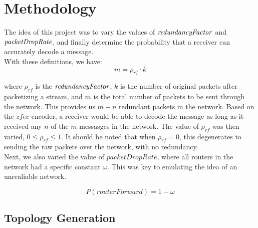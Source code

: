 \section{Methodology}
\label{sec: Methodology}

The idea of this project was to vary the values of $\it{redundancyFactor}$ and $\it{packetDropRate}$, and finally determine the probability that a receiver can accurately decode a message. \\
With these definitions, we have: 
\begin{equation} \label{eq: yPlus}
    m = \rho_{rf} \cdot k
\end{equation}

where $\rho_{rf}$ is the $\it{redundancyFactor}$, $k$ is the number of original packets after packetizing a stream, and $m$ is the total number of packets to be sent through the network. This provides us 
$m-n$ redundant packets in the network. Based on the $zfec$ encoder, a receiver would be able to decode the message as long as it received any $n$ of the $m$ messasges in the network. The value of $\rho_{rf}$ was then varied, $0\leq\rho_{rf}\leq1$. It should be noted that when $\rho_{rf} = 0$, this degenerates to sending the raw packets over the network, with no redundancy. \\
Next, we also varied the value of $packetDropRate$, where all routers in the network had a specific constant $\omega$. This was key to emulating the idea of an unrealiable network. 

\begin{equation} \label{eq: yPlus}
    P(routerForward) = 1-\omega
\end{equation}


\subsection{Topology Generation}

